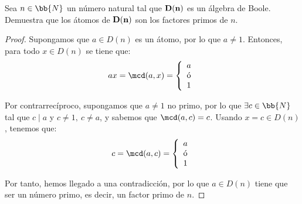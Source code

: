 \begin{ejercicio}
    Sea $n\in \bb{N}$ un número natural tal que $\bf{D}(n)$ es un álgebra de Boole. Demuestra que
    los átomos de $\bf{D}(n)$ son los factores primos de $n$.
    \begin{proof}
        Supongamos que $a\in D(n)$ es un átomo, por lo que $a\neq 1$. Entonces, para todo $x\in D(n)$ se tiene que:
        \begin{equation*}
            ax = \mcd(a,x) = \left\{
                \begin{array}{c}
                    a \\
                    \text{ó} \\
                    1
                \end{array}
            \right.
        \end{equation*}

        Por contrarrecíproco, supongamos que $a\neq 1$ no primo, por lo que $\exists c\in \bb{N}$ tal que $c\mid a$ y $c\neq 1,~c\neq a$,
        y sabemos que $\mcd(a,c)=c$. Usando $x=c\in D(n)$, tenemos que:
        \begin{equation*}
            c = \mcd(a,c) = \left\{
                \begin{array}{c}
                    a \\
                    \text{ó} \\
                    1
                \end{array}
            \right.
        \end{equation*}

        Por tanto, hemos llegado a una contradicción, por lo que $a\in D(n)$ tiene que ser un número primo, es decir, un factor primo de $n$.
    \end{proof}
\end{ejercicio}


